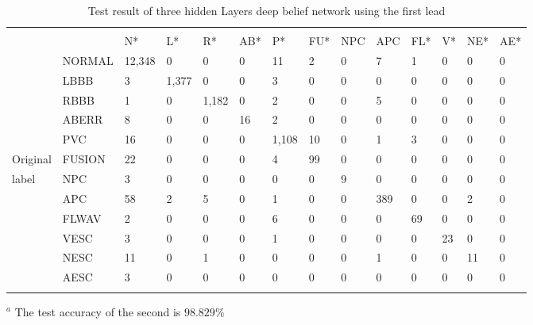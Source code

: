 \documentclass[graybox]{svmult}
\begin{document}
\begin{table}
\caption{Test result of three hidden Layers deep belief network using the first lead}
\label{tab:9}  
\begin{tabular}{p{1cm}p{1.2cm}p{0.9cm}p{0.7cm}p{0.7cm}p{0.6cm}p{0.6cm}p{0.6cm}p{0.7cm}p{0.6cm}p{0.6cm}p{0.6cm}p{0.7cm}p{0.7cm}}
\hline\noalign{\smallskip}
\multicolumn{9}{r}{Algorithm classified label} \\
\noalign{\smallskip}\hline\noalign{\smallskip}
		 &      & N* & L* & R* & AB* & P* & FU* & NPC & APC & FL* & V* & NE*& AE*\\
\noalign{\smallskip}\svhline\noalign{\smallskip}
	 & NORMAL & 12,348& 0   &  0   &  0   &  11  &  2    &	0   &  7  &   1   &   0  &  0  &  0 \\
	     & LBBB   &  3    & 1,377&  0  &  0   &  3   &  0    &  0   &  0  &   0   &   0  &  0  &  0 \\
		 & RBBB   &  1    &  0  & 1,182&  0   &  2   &  0    &	0   &  5  &   0   &   0  &  0  &  0 \\
		 & ABERR  &  8    &  0  &  0   &  16  &  2   &  0    &	0   &  0  &   0   &   0  &  0  &  0 \\
		 & PVC    &  16   &  0  &  0   &  0   & 1,108&  10   &	0   &  1  &   3   &   0  &  0  &  0 \\
Original & FUSION &	 22   &  0  &  0   &  0   &  4   &   99  &	0   &  0  &   0   &   0  &  0  &  0 \\
label    & NPC    &	 3    &  0  &  0   &  0   &  0   &  0    &	9   &  0  &   0   &   0  &  0  &  0 \\
		 & APC    &	 58   &  2  &  5   &  0   &  1   &  0    &	0   &  389&   0   &   0  &  2  &  0 \\
		 & FLWAV  &	 2    &  0  &  0   &  0   &  6   &  0    &	0   &  0  &   69  &   0  &  0  &  0 \\
		 & VESC   &	 3    &  0  &  0   &  0   &  1   &  0    &	0   &  0  &   0   &  23  &  0  &  0 \\
		 & NESC   &	 11   &  0  &  1   &  0   &  0   &  0    &	0   &  1  &   0   &   0  &  11 &  0 \\
		 & AESC   &	 3    &  0  &  0   &  0   &  0   &  0    &	0   &  0  &   0   &   0  &  0  &  0 \\
\noalign{\smallskip}\hline\noalign{\smallskip}
\end{tabular}
$^a$ The test accuracy of the second is $98.829\%$
\end{table}
\end{document}
